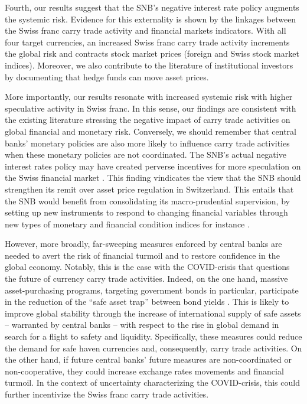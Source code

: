 \documentclass[a4paper, twoside]{templates/ociamthesis}
\begin{document}
Fourth, our results suggest that the SNB's negative interest rate policy augments the systemic risk. Evidence for this externality is shown by the linkages between the Swiss franc carry trade activity and financial markets indicators. With all four target currencies, an increased Swiss franc carry trade activity increments the global risk and contracts stock market prices (foreign and Swiss stock market indices). Moreover, we also contribute to the literature of institutional investors by documenting that hedge funds can move asset prices.

More importantly, our results resonate with increased systemic risk with higher speculative activity in Swiss franc. In this sense, our findings are consistent with the existing literature stressing the negative impact of carry trade activities on global financial and monetary risk. Conversely, we should remember that central banks' monetary policies are also more likely to influence carry trade activities when these monetary policies are not coordinated. The SNB's actual negative interest rates policy may have created perverse incentives for more speculation on the Swiss financial market \autocite{rossi2019}. This finding vindicates the view that the SNB should strengthen its remit over asset price regulation in Switzerland. This entails that the SNB would benefit from consolidating its macro-prudential supervision, by setting up new instruments to respond to changing financial variables through new types of monetary and financial condition indices for instance \autocite{guillaumin2017}.

However, more broadly, far-sweeping measures enforced by central banks are needed to avert the risk of financial turmoil and to restore confidence in the global economy. Notably, this is the case with the COVID-crisis that questions the future of currency carry trade activities. Indeed, on the one hand, massive asset-purchasing programs, targeting government bonds in particular, participate in the reduction of the ``safe asset trap'' between bond yields \autocite{reviglio2020}. This is likely to improve global stability through the increase of international supply of safe assets -- warranted by central banks -- with respect to the rise in global demand in search for a flight to safety and liquidity. Specifically, these measures could reduce the demand for safe haven currencies and, consequently, carry trade activities. On the other hand, if future central banks' future measures are non-coordinated or non-cooperative, they could increase exchange rates movements and financial turmoil. In the context of uncertainty characterizing the COVID-crisis, this could further incentivize the Swiss franc carry trade activities.
\end{document}
